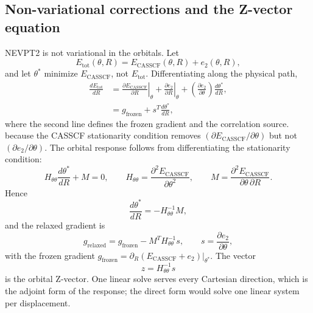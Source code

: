 \subsection{Non-variational corrections and the Z-vector equation}
\label{sec:chain-zvector}

NEVPT2 is not variational in the orbitals.  Let
\begin{equation}
  E_{\mathrm{tot}}(\theta,R)
  = E_{\mathrm{CASSCF}}(\theta,R) + e_2(\theta,R),
  \label{eq:chain-total-energy}
\end{equation}
and let $\theta^{*}$ minimize $E_{\mathrm{CASSCF}}$, not
$E_{\mathrm{tot}}$.  Differentiating along the physical path,
\begin{align}
  \frac{dE_{\mathrm{tot}}}{dR}
  &= \left.\frac{\partial E_{\mathrm{CASSCF}}}{\partial R}\right|_{\theta}
   + \left.\frac{\partial e_2}{\partial R}\right|_{\theta}
   + \left(\frac{\partial e_2}{\partial\theta}\right)
     \frac{d\theta^{*}}{dR}, \nonumber\\
  &= g_{\mathrm{frozen}} + s^{T}\frac{d\theta^{*}}{dR},
  \label{eq:chain-nonvar-raw}
\end{align}
where the second line defines the frozen gradient and the correlation
source.
because the CASSCF stationarity condition removes
$(\partial E_{\mathrm{CASSCF}}/\partial\theta)$ but not
$(\partial e_2/\partial\theta)$.  The orbital response follows from
differentiating the stationarity condition:
\begin{equation}
  H_{\theta\theta}\frac{d\theta^{*}}{dR} + M = 0,
  \qquad
  H_{\theta\theta}
  = \frac{\partial^{2}E_{\mathrm{CASSCF}}}{\partial\theta^{2}},
  \qquad
  M = \frac{\partial^{2}E_{\mathrm{CASSCF}}}{\partial\theta\,\partial R}.
  \label{eq:chain-response-eq}
\end{equation}
Hence
\begin{equation}
  \frac{d\theta^{*}}{dR} = -H_{\theta\theta}^{-1}M,
  \label{eq:chain-dtheta}
\end{equation}
and the relaxed gradient is
\begin{equation}
  g_{\mathrm{relaxed}}
  = g_{\mathrm{frozen}} - M^{T}H_{\theta\theta}^{-1}s,
  \qquad
  s = \frac{\partial e_2}{\partial\theta},
  \label{eq:chain-zvector}
\end{equation}
with the frozen gradient
$g_{\mathrm{frozen}}=\partial_R(E_{\mathrm{CASSCF}}+e_2)|_{\theta^{*}}$.
The vector
\begin{equation}
  z = H_{\theta\theta}^{-1}s
  \label{eq:chain-z}
\end{equation}
is the orbital Z-vector.  One linear solve serves every Cartesian
direction, which is the adjoint form of the response; the direct form
would solve one linear system per displacement.

